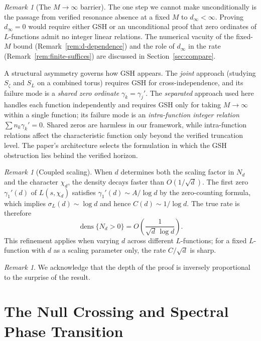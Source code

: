 \documentclass[12pt,reqno]{amsart}
\theoremstyle{plain}
\theoremstyle{definition}
\theoremstyle{remark}
\newtheorem{remark}[theorem]{Remark}
\DeclareMathOperator{\dens}{dens}
\begin{document}
\begin{remark}[The $M \to \infty$ barrier]\label{rem:M-infty}
The one step we cannot make unconditionally is the passage from verified resonance absence at a fixed $M$ to $d_\infty < \infty$.  Proving $d_\infty = 0$ would require either GSH or an unconditional proof that zero ordinates of $L$-functions admit no integer linear relations.  The numerical vacuity of the fixed-$M$ bound (Remark~\ref{rem:d-dependence}) and the role of $d_\infty$ in the rate (Remark~\ref{rem:finite-suffices}) are discussed in Section~\ref{sec:compare}.

A structural asymmetry governs how GSH appears.  The \emph{joint} approach (studying $S_\zeta$ and $S_L$ on a combined torus) requires GSH for cross-independence, and its failure mode is a \emph{shared zero ordinate} $\gamma_k = \gamma_j'$.  The \emph{separated} approach used here handles each function independently and requires GSH only for taking $M \to \infty$ within a single function; its failure mode is an \emph{intra-function integer relation} $\sum n_k \gamma_k' = 0$.  Shared zeros are harmless in our framework, while intra-function relations affect the characteristic function only beyond the verified truncation level.  The paper's architecture selects the formulation in which the GSH obstruction lies behind the verified horizon.
\end{remark}

\begin{remark}[Coupled scaling]\label{rem:coupled}
When $d$ determines both the scaling factor in $N_d$ and the character $\chi_d$, the density decays faster than $O(1/\sqrt{d})$.  The first zero $\gamma_1'(d)$ of $L(s,\chi_d)$ satisfies $\gamma_1'(d) \sim A/\log d$ by the zero-counting formula, which implies $\sigma_L(d) \sim \log d$ and hence $C(d) \sim 1/\log d$.  The true rate is therefore
\[
  \dens\{N_d > 0\} = O\!\left(\frac{1}{\sqrt{d}\,\log d}\right).
\]
This refinement applies when varying $d$ across different $L$-functions; for a fixed $L$-function with $d$ as a scaling parameter only, the rate $C/\sqrt{d}$ is sharp.
\end{remark}

\begin{remark}
We acknowledge that the depth of the proof is inversely proportional to the surprise of the result.
\end{remark}
\section{The Null Crossing and Spectral Phase Transition}\label{sec:null-crossing}
\end{document}
